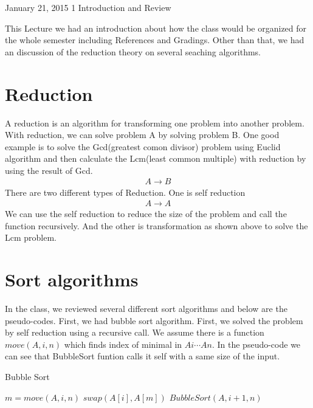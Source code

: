 \documentclass[usletter]{article}
\begin{document}
           {January 21, 2015}                          %
           {1}                                         %
           {Introduction and Review}  %

\noindent
This Lecture we had an introduction about how the class 
would be organized for the whole semester including References\cite{DPV}\cite{JS}\cite{ws} and
Gradings. Other than that, we had an discussion of the reduction 
theory on several seaching algorithms.

\section{Reduction}
A reduction is an algorithm for transforming one problem into another problem.
With reduction, we can solve problem A by solving problem B. One good example is to solve the
Gcd(greatest comon divisor) problem using Euclid algorithm and then calculate the Lcm(least common multiple) 
with reduction by using the result of Gcd.
\begin{align}
A \rightarrow B
\end{align}
There are two different types of Reduction. One is self reduction 
\begin{align}
A \rightarrow A
\end{align}
We can use the self reduction to reduce the size of the problem and call the function recursively.
And the other is transformation as shown above to solve the Lcm problem.

\section{Sort algorithms}
In the class, we reviewed several different sort algorithms and below are the pseudo-codes. First, we had bubble sort algorithm. First, we solved the problem by self reduction using a recursive call. We assume there is
a function $move(A, i, n)$ which finds index of minimal in $Ai\cdots An$. In the pseudo-code we can see that BubbleSort funtion calls 
it self with a same size of the input.

\begin{algorithm}
\caption{Bubble Sort}
\begin{algorithmic}[1]
	\State $m = move(A,i,n)$
	\State $swap(A[i],A[m])$
	\State $BubbleSort(A,i+1,n)$
\EndIf
\EndProcedure
\end{algorithmic}
\end{algorithm}
\end{document}
